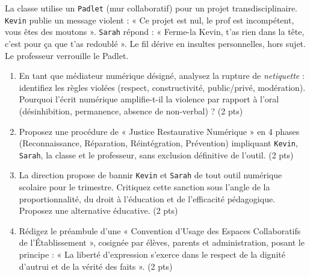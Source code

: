 \documentclass[11pt]{article}
\begin{document}
\begin{exercice}
La classe utilise un \texttt{Padlet} (mur collaboratif) pour un projet transdisciplinaire. \texttt{Kevin} publie un message violent : « Ce projet est nul, le prof est incompétent, vous êtes des moutons ». \texttt{Sarah} répond : « Ferme-la Kevin, t'as rien dans la tête, c'est pour ça que t'as redoublé ». Le fil dérive en insultes personnelles, hors sujet. Le professeur verrouille le Padlet.
\begin{enumerate}
    \item En tant que médiateur numérique désigné, analysez la rupture de \textit{netiquette} : identifiez les règles violées (respect, constructivité, public/privé, modération). Pourquoi l'écrit numérique amplifie-t-il la violence par rapport à l'oral (désinhibition, permanence, absence de non-verbal) ? (2 pts)
    \item Proposez une procédure de « Justice Restaurative Numérique » en 4 phases (Reconnaissance, Réparation, Réintégration, Prévention) impliquant \texttt{Kevin}, \texttt{Sarah}, la classe et le professeur, sans exclusion définitive de l'outil. (2 pts)
    \item La direction propose de bannir \texttt{Kevin} et \texttt{Sarah} de tout outil numérique scolaire pour le trimestre. Critiquez cette sanction sous l'angle de la proportionnalité, du droit à l'éducation et de l'efficacité pédagogique. Proposez une alternative éducative. (2 pts)
    \item Rédigez le préambule d'une « Convention d'Usage des Espaces Collaboratifs de l'Établissement », cosignée par élèves, parents et administration, posant le principe : « La liberté d'expression s'exerce dans le respect de la dignité d'autrui et de la vérité des faits ». (2 pts)
\end{enumerate}
\end{exercice}
\end{document}

